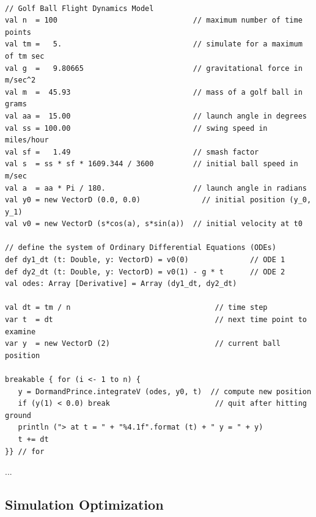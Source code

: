\documentclass{wscpaperproc}
\theoremstyle{wsc}
\begin{document}
\begin{small}
\begin{verbatim}

// Golf Ball Flight Dynamics Model
val n  = 100                               // maximum number of time points
val tm =   5.                              // simulate for a maximum of tm sec
val g  =   9.80665                         // gravitational force in m/sec^2
val m  =  45.93                            // mass of a golf ball in grams
val aa =  15.00                            // launch angle in degrees
val ss = 100.00                            // swing speed in miles/hour
val sf =   1.49                            // smash factor
val s  = ss * sf * 1609.344 / 3600         // initial ball speed in m/sec
val a  = aa * Pi / 180.                    // launch angle in radians
val y0 = new VectorD (0.0, 0.0)              // initial position (y_0, y_1)
val v0 = new VectorD (s*cos(a), s*sin(a))  // initial velocity at t0

// define the system of Ordinary Differential Equations (ODEs)
def dy1_dt (t: Double, y: VectorD) = v0(0)              // ODE 1
def dy2_dt (t: Double, y: VectorD) = v0(1) - g * t      // ODE 2
val odes: Array [Derivative] = Array (dy1_dt, dy2_dt)

val dt = tm / n                                 // time step
var t  = dt                                     // next time point to examine
var y  = new VectorD (2)                        // current ball position

breakable { for (i <- 1 to n) {
   y = DormandPrince.integrateV (odes, y0, t)  // compute new position
   if (y(1) < 0.0) break                        // quit after hitting ground
   println ("> at t = " + "%4.1f".format (t) + " y = " + y)
   t += dt
}} // for

\end{verbatim}
\end{small}

...

\subsection{Simulation Optimization}
\end{document}
